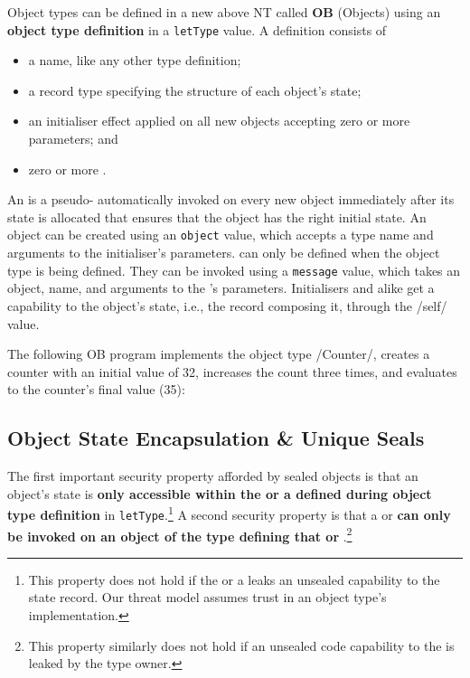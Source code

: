 \documentclass[main.tex]{subfiles}
\begin{document}
Object types can be defined in a new  above NT called \textbf{OB} (Objects) using an \textbf{object type definition} in a \texttt{letType} value. A definition consists of
\begin{itemize}[nosep]
	\item a name, like any other type definition;
	\item a record type specifying the structure of each object's state;
	\item an initialiser effect applied on all new objects accepting zero or more parameters; and
	\item zero or more .
\end{itemize}

An \textbf{} is a pseudo- automatically invoked on every new object immediately after its state is allocated that ensures that the object has the right initial state. An object can be created using an \texttt{object} value, which accepts a type name and arguments to the initialiser's parameters.  can only be defined when the object type is being defined. They can be invoked using a \texttt{message} value, which takes an object,  name, and arguments to the 's parameters. Initialisers and  alike get a capability to the object's state, i.e., the record composing it, through the \iil/self/ value.

The following OB program implements the object type \iil/Counter/, creates a counter with an initial value of 32, increases the count three times, and evaluates to the counter's final value (35):

\subsection{Object State Encapsulation \& Unique Seals} \label{sct:obj-sec}
The first important security property afforded by sealed objects is that an object's state is \textbf{only accessible within the  or a  defined during object type definition} in \texttt{letType}.\footnote{This property does not hold if the  or a  leaks an unsealed capability to the state record. Our threat model assumes trust in an object type's implementation.} A second security property is that a  or  \textbf{can only be invoked on an object of the type defining that  or }.\footnote{This property similarly does not hold if an unsealed code capability to the  is leaked by the type owner.}
\end{document}
